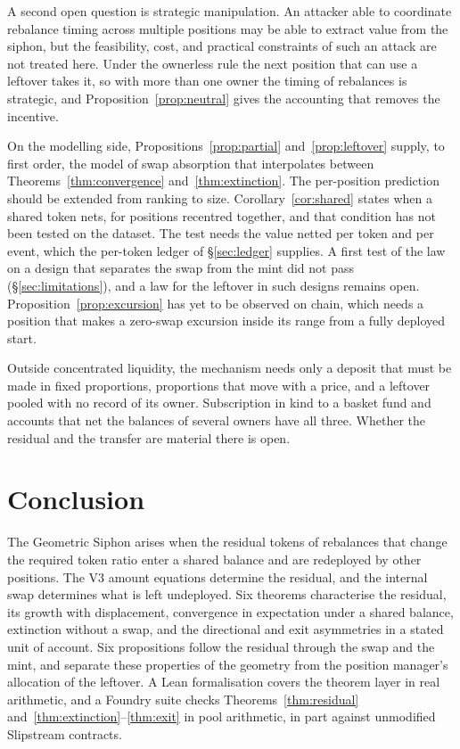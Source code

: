 \documentclass[11pt,a4paper]{article}
\theoremstyle{siphon}
\begin{document}
A second open question is strategic manipulation. An attacker able to coordinate rebalance timing across multiple positions may be able to extract value from the siphon, but the feasibility, cost, and practical constraints of such an attack are not treated here. Under the ownerless rule the next position that can use a leftover takes it, so with more than one owner the timing of rebalances is strategic, and Proposition~\ref{prop:neutral} gives the accounting that removes the incentive.

On the modelling side, Propositions~\ref{prop:partial} and~\ref{prop:leftover} supply, to first order, the model of swap absorption that interpolates between Theorems~\ref{thm:convergence} and~\ref{thm:extinction}. The per-position prediction should be extended from ranking to size. Corollary~\ref{cor:shared} states when a shared token nets, for positions recentred together, and that condition has not been tested on the dataset. The test needs the value netted per token and per event, which the per-token ledger of \S\ref{sec:ledger} supplies. A first test of the law on a design that separates the swap from the mint did not pass (\S\ref{sec:limitations}), and a law for the leftover in such designs remains open. Proposition~\ref{prop:excursion} has yet to be observed on chain, which needs a position that makes a zero-swap excursion inside its range from a fully deployed start.

Outside concentrated liquidity, the mechanism needs only a deposit that must be made in fixed proportions, proportions that move with a price, and a leftover pooled with no record of its owner. Subscription in kind to a basket fund and accounts that net the balances of several owners have all three. Whether the residual and the transfer are material there is open.

\section{Conclusion}\label{sec:conclusion}

The Geometric Siphon arises when the residual tokens of rebalances that change the required token ratio enter a shared balance and are redeployed by other positions. The V3 amount equations determine the residual, and the internal swap determines what is left undeployed. Six theorems characterise the residual, its growth with displacement, convergence in expectation under a shared balance, extinction without a swap, and the directional and exit asymmetries in a stated unit of account. Six propositions follow the residual through the swap and the mint, and separate these properties of the geometry from the position manager's allocation of the leftover. A Lean formalisation covers the theorem layer in real arithmetic, and a Foundry suite checks Theorems~\ref{thm:residual} and~\ref{thm:extinction}--\ref{thm:exit} in pool arithmetic, in part against unmodified Slipstream contracts.
\end{document}
